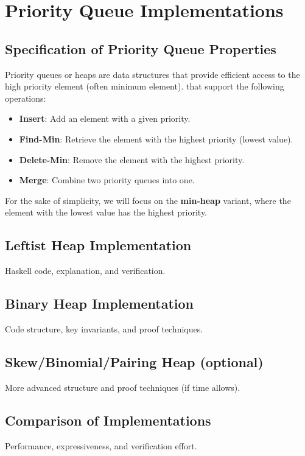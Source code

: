 \chapter { Priority Queue Implementations }
\section { Specification of Priority Queue Properties }

Priority queues or heaps are data structures that provide efficient access to the high priority element (often minimum element).
that support the following operations:

\begin{itemize}
	\item \textbf{Insert}: Add an element with a given priority.
	\item \textbf{Find-Min}: Retrieve the element with the highest priority (lowest value).
	\item \textbf{Delete-Min}: Remove the element with the highest priority.
	\item \textbf{Merge}: Combine two priority queues into one.
\end{itemize}

For the sake of simplicity, we will focus on the \textbf{min-heap} variant, where the element with the lowest value has the highest priority.

\section { Leftist Heap Implementation }
Haskell code, explanation, and verification.

\section { Binary Heap Implementation }
Code structure, key invariants, and proof techniques.

\section { Skew/Binomial/Pairing Heap (optional) }
More advanced structure and proof techniques (if time allows).

\section { Comparison of Implementations }
Performance, expressiveness, and verification effort.
